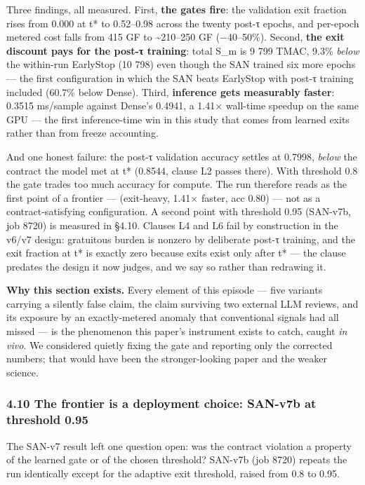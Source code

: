 \documentclass[
]{article}
\begin{document}
Three findings, all measured. First, \textbf{the gates fire}: the
validation exit fraction rises from 0.000 at t* to 0.52--0.98 across the
twenty post-τ epochs, and per-epoch metered cost falls from 415 GF to
\textasciitilde210--250 GF (−40--50\%). Second, \textbf{the exit
discount pays for the post-τ training}: total S\_m is 9 799 TMAC, 9.3\%
\emph{below} the within-run EarlyStop (10 798) even though the SAN
trained six more epochs --- the first configuration in which the SAN
beats EarlyStop with post-τ training included (60.7\% below Dense).
Third, \textbf{inference gets measurably faster}: 0.3515 ms/sample
against Dense's 0.4941, a 1.41× wall-time speedup on the same GPU ---
the first inference-time win in this study that comes from learned exits
rather than from freeze accounting.

And one honest failure: the post-τ validation accuracy settles at
0.7998, \emph{below} the contract the model met at t* (0.8544, clause L2
passes there). With threshold 0.8 the gate trades too much accuracy for
compute. The run therefore reads as the first point of a frontier ---
(exit-heavy, 1.41× faster, acc 0.80) --- not as a contract-satisfying
configuration. A second point with threshold 0.95 (SAN-v7b, job 8720) is
measured in §4.10. Clauses L4 and L6 fail by construction in the v6/v7
design: gratuitous burden is nonzero by deliberate post-τ training, and
the exit fraction at t* is exactly zero because exits exist only after
t* --- the clause predates the design it now judges, and we say so
rather than redrawing it.

\textbf{Why this section exists.} Every element of this episode --- five
variants carrying a silently false claim, the claim surviving two
external LLM reviews, and its exposure by an exactly-metered anomaly
that conventional signals had all missed --- is the phenomenon this
paper's instrument exists to catch, caught \emph{in vivo}. We considered
quietly fixing the gate and reporting only the corrected numbers; that
would have been the stronger-looking paper and the weaker science.

\hypertarget{the-frontier-is-a-deployment-choice-san-v7b-at-threshold-0.95}{%
\subsubsection{4.10 The frontier is a deployment choice: SAN-v7b at
threshold
0.95}\label{the-frontier-is-a-deployment-choice-san-v7b-at-threshold-0.95}}

The SAN-v7 result left one question open: was the contract violation a
property of the learned gate or of the chosen threshold? SAN-v7b (job
8720) repeats the run identically except for the adaptive exit
threshold, raised from 0.8 to 0.95.
\end{document}
